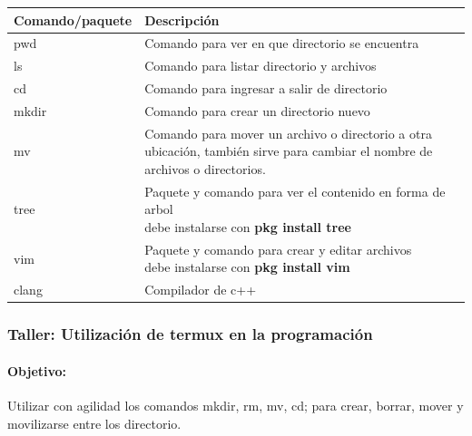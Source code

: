 \documentclass[a4paper,12pt,spanish]{article}
\begin{document}
\begin{tabular}[H]{|l|m{11cm}|}
  \hline
  Comando/paquete & Descripción  \\ \hline \hline
  pwd & Comando para ver en que directorio se encuentra \\ \hdashline
  ls & Comando para listar directorio y archivos \\ \hdashline
  cd & Comando para ingresar a salir de directorio \\ \hdashline
  mkdir & Comando para crear un directorio nuevo   \\ \hdashline
  mv & Comando para mover un archivo o directorio a otra ubicación, también sirve para cambiar el nombre de archivos o directorios. \\ \hline \hline
  tree & \makecell[l]{Paquete y comando para ver el contenido en forma de arbol \\ debe instalarse con \textbf{pkg install tree}} \\ \hdashline
  vim & \makecell[l]{Paquete y comando para crear y editar archivos \\ debe instalarse con \textbf{pkg install vim}} \\ \hdashline
  clang & Compilador de c++\\   \hline
\end{tabular}



\subsubsection{Taller: Utilización de termux en la programación}
\label{sec:tall-util-de}


\paragraph{Objetivo:}
Utilizar con agilidad los comandos mkdir, rm, mv, cd;  para crear, borrar, mover y movilizarse entre los directorio.
\end{document}
